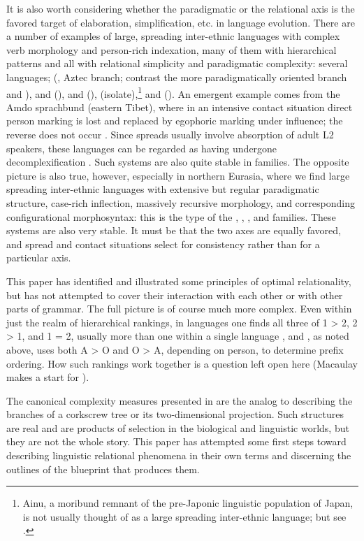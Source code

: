 \documentclass[output=paper,hidelinks]{langscibook}
\begin{document}
It is also worth considering whether the paradigmatic or the relational axis is the favored target of elaboration, simplification, etc. in language evolution.  There are a number of examples of large, spreading inter-ethnic languages with complex verb morphology and person-rich indexation, many of them with hierarchical patterns and all with relational simplicity and paradigmatic complexity: several  languages;  (, Aztec branch; contrast the more paradigmatically oriented  branch and ),  and  (),  and  (),  (isolate),\footnote{Ainu, a moribund remnant of the pre-Japonic linguistic population of Japan, is not usually thought of as a large spreading inter-ethnic language; but see \cite{Janhunen2002}.}  and  (). An emergent example comes from the Amdo sprachbund (eastern Tibet), where in an intensive contact situation direct person marking is lost and replaced by egophoric marking under  influence; the reverse does not occur \citep{Janhunen2012b}.  Since spreads usually involve absorption of adult L2 speakers, these languages can be regarded as having undergone decomplexification \citep{Trudgill2011}.  Such systems are also quite stable in families.  The opposite picture is also true, however, especially in northern Eurasia, where we find large spreading inter-ethnic languages with extensive but regular paradigmatic structure, case-rich inflection, massively recursive morphology, and corresponding configurational morphosyntax: this is the type of the , , , and  families.  These systems are also very stable.  It must be that the two axes are equally favored, and spread and contact situations select for consistency rather than for a particular axis.

This paper has identified and illustrated some principles of optimal relationality, but has not attempted to cover their interaction with each other or with other parts of grammar.  The full picture is of course much more complex. Even within just the realm of hierarchical rankings, in  languages one finds all three of 1 > 2, 2 > 1, and 1 = 2, usually more than one within a single language \citep{Macaulay2009}, and , as noted above, uses both A > O and O > A, depending on person, to determine prefix ordering.  How such rankings work together is a question left open here (Macaulay makes a start for ).

The canonical complexity measures presented in  are the analog to describing the branches of a corkscrew tree or its two-dimensional projection.  Such structures are real and are products of selection in the biological and linguistic worlds, but they are not the whole story.  This paper has attempted some first steps toward describing linguistic relational phenomena in their own terms and discerning the outlines of the blueprint that produces them.

{\sloppy\printbibliography[heading=subbibliography,notkeyword=this]}
\end{document}
